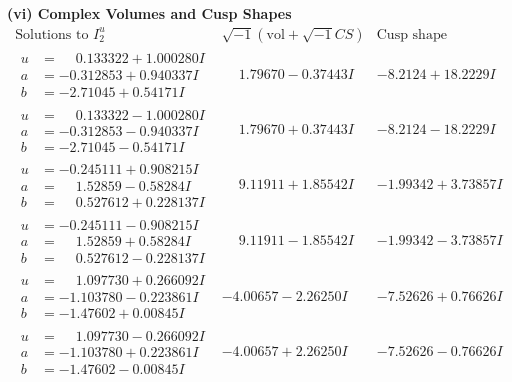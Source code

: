\documentclass[1p]{elsarticle_modified}
\theoremstyle{definition}
\newcommand{\I}{\sqrt{-1}}
\begin{document}
\newpage\flushleft \textbf{(vi) Complex Volumes and Cusp Shapes}
$$\begin{array}{c|c|c}  
\text{Solutions to }I^u_{2}& \I (\text{vol} + \sqrt{-1}CS) & \text{Cusp shape}\\
 \hline 
\begin{aligned}
u &= \phantom{-}0.133322 + 1.000280 I \\
a &= -0.312853 + 0.940337 I \\
b &= -2.71045 + 0.54171 I\end{aligned}
 & \phantom{-}1.79670 - 0.37443 I & -8.2124 + 18.2229 I \\ \hline\begin{aligned}
u &= \phantom{-}0.133322 - 1.000280 I \\
a &= -0.312853 - 0.940337 I \\
b &= -2.71045 - 0.54171 I\end{aligned}
 & \phantom{-}1.79670 + 0.37443 I & -8.2124 - 18.2229 I \\ \hline\begin{aligned}
u &= -0.245111 + 0.908215 I \\
a &= \phantom{-}1.52859 - 0.58284 I \\
b &= \phantom{-}0.527612 + 0.228137 I\end{aligned}
 & \phantom{-}9.11911 + 1.85542 I & -1.99342 + 3.73857 I \\ \hline\begin{aligned}
u &= -0.245111 - 0.908215 I \\
a &= \phantom{-}1.52859 + 0.58284 I \\
b &= \phantom{-}0.527612 - 0.228137 I\end{aligned}
 & \phantom{-}9.11911 - 1.85542 I & -1.99342 - 3.73857 I \\ \hline\begin{aligned}
u &= \phantom{-}1.097730 + 0.266092 I \\
a &= -1.103780 - 0.223861 I \\
b &= -1.47602 + 0.00845 I\end{aligned}
 & -4.00657 - 2.26250 I & -7.52626 + 0.76626 I \\ \hline\begin{aligned}
u &= \phantom{-}1.097730 - 0.266092 I \\
a &= -1.103780 + 0.223861 I \\
b &= -1.47602 - 0.00845 I\end{aligned}
 & -4.00657 + 2.26250 I & -7.52626 - 0.76626 I \\ \hline\begin{aligned}

\end{aligned}
\end{array}$$
\end{document}
